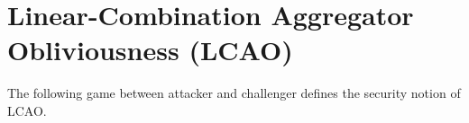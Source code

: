 % 
%                                            
%                                            
%                                            
% 

\chapter{Linear-Combination Aggregator Obliviousness (LCAO)}\label{app:lcao_definition}
The following game between attacker and challenger defines the security notion of LCAO.

